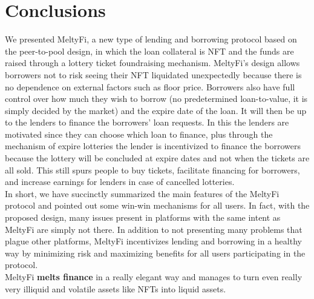 \section{Conclusions}\label{sec:conclusions}
We presented MeltyFi, a new type of lending and borrowing protocol based on the peer-to-pool design, in which the loan collateral is NFT and the funds are raised through a lottery ticket foundraising mechanism. MeltyFi's design allows borrowers not to risk seeing their NFT liquidated unexpectedly because there is no dependence on external factors such as floor price. Borrowers also have full control over how much they wish to borrow (no predetermined loan-to-value, it is simply decided by the market) and the expire date of the loan. It will then be up to the lenders to finance the borrowers' loan requests. In this the lenders are motivated since they can choose which loan to finance, plus through the mechanism of expire lotteries the lender is incentivized to finance the borrowers because the lottery will be concluded at expire dates and not when the tickets are all sold. This still spurs people to buy tickets, facilitate financing for borrowers, and increase earnings for lenders in case of cancelled lotteries. 
\\
\indent In short, we have succinctly summarized the main features of the MeltyFi protocol and pointed out some win-win mechanisms for all users. In fact, with the proposed design, many issues present in platforms with the same intent as MeltyFi are simply not there. In addition to not presenting many problems that plague other platforms, MeltyFi incentivizes lending and borrowing in a healthy way by minimizing risk and maximizing benefits for all users participating in the protocol. 
\\
\indent MeltyFi \textbf{melts finance} in a really elegant way and manages to turn even really very illiquid and volatile assets like NFTs into liquid assets.